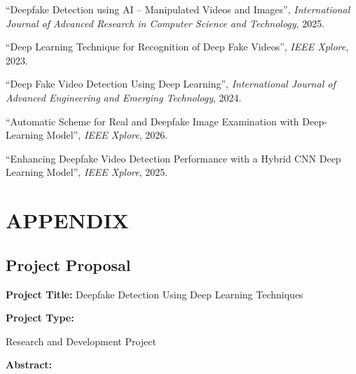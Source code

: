 \documentclass[12pt,a4paper]{report}
\begin{document}
\begin{enumerate}[label={[\arabic*]}]
\item ``Deepfake Detection using AI -- Manipulated Videos and Images'', \textit{International Journal of Advanced Research in Computer Science and Technology}, 2025.

\item ``Deep Learning Technique for Recognition of Deep Fake Videos'', \textit{IEEE Xplore}, 2023.

\item ``Deep Fake Video Detection Using Deep Learning'', \textit{International Journal of Advanced Engineering and Emerging Technology}, 2024.

\item ``Automatic Scheme for Real and Deepfake Image Examination with Deep-Learning Model'', \textit{IEEE Xplore}, 2026.

\item ``Enhancing Deepfake Video Detection Performance with a Hybrid CNN Deep Learning Model'', \textit{IEEE Xplore}, 2025.


\end{enumerate}
	

\chapter*{APPENDIX}


\vspace{0.5cm}
\section*{Project Proposal}
\vspace{0.5cm}
\textbf{Project Title:}
Deepfake Detection Using Deep Learning Techniques
\vspace{0.5cm}

\textbf{Project Type:}

Research and Development Project

\vspace{0.5cm}
\textbf{Abstract:}
\end{document}

